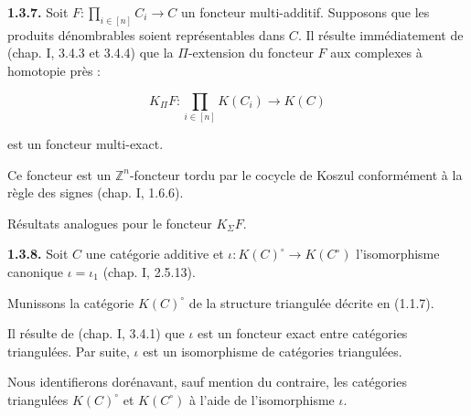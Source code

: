 \clearpage
{}%
\begingroup
\small
\setlength{\emergencystretch}{1.5em}%
\setlength{\abovedisplayskip}{4pt plus 2pt minus 2pt}%
\setlength{\belowdisplayskip}{4pt plus 2pt minus 2pt}%

\noindent\textbf{1.3.7.}\quad
{}
Soit
$F\colon \prod_{i\in[n]} C_i\longrightarrow C$
un foncteur multi-additif. Supposons que les produits dénombrables soient
représentables dans $C$. Il résulte immédiatement de
(chap. I, 3.4.3 et 3.4.4) que la $\Pi$-extension du foncteur $F$ aux
complexes à homotopie près :

\[
  K_{\Pi}F\colon \prod_{i\in[n]} K(C_i)\longrightarrow K(C)
\]

\noindent est un foncteur multi-exact.

Ce foncteur est un $\mathbb Z^n$-foncteur tordu par le cocycle de Koszul
conformément à la règle des signes (chap. I, 1.6.6).

Résultats analogues pour le foncteur $K_{\Sigma}F$.

\medskip
\noindent\textbf{1.3.8.}\quad
{}
Soit $C$ une catégorie additive et
$\iota\colon K(C)^\circ\longrightarrow K(C^\circ)$ l'isomorphisme
canonique $\iota=\iota_1$ (chap. I, 2.5.13).

Munissons la catégorie $K(C)^\circ$ de la structure triangulée décrite
en (1.1.7).

Il résulte de (chap. I, 3.4.1) que $\iota$ est un foncteur exact entre
catégories triangulées. Par suite, $\iota$ est un isomorphisme de
catégories triangulées.

Nous identifierons dorénavant, sauf mention du contraire, les catégories
triangulées $K(C)^\circ$ et $K(C^\circ)$ à l'aide de l'isomorphisme
$\iota$.
\endgroup
